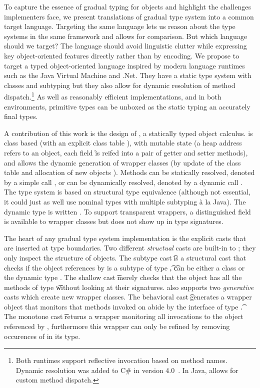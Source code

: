 \documentclass[a4paper,USenglish]{tex/lipics-v2016}
\begin{document}
To capture the essence of gradual typing for objects and highlight the
challenges implementers face, we present translations of gradual type system
into a common target language. Targeting the same language lets us reason
about the type systems in the same framework and allows for comparison. But
which language should we target? The language should avoid linguistic
clutter while expressing key object-oriented features directly rather than
by encoding. We propose to target a typed object-oriented language inspired
by modern language runtimes such as the Java Virtual Machine and .Net.  They
have a static type system with classes and subtyping but they also allow for
dynamic resolution of method dispatch.\footnote{Both runtimes support
  reflective invocation based on method names. Dynamic resolution was added
  to C\# in version 4.0~\cite{BAT14}. In Java,  allows for
  custom method dispatch.} As well as reasonably efficient implementations,
and in both environments, primitive types can be unboxed as the static
typing an accurately final types.

A contribution of this work is the design of \kafka, a statically typed
object calculus.  \kafka is class based (with an explicit class table \K),
with mutable state (a heap address \a refers to an object, each field \f is
reifed into a pair of getter and setter methods), and allows the dynamic
generation of wrapper classes (by update of the class table \K and
allocation of new objects \a).  Methods can be statically resolved, denoted
by a simple call \Call\a\m\x, or can be dynamically resolved, denoted by a
dynamic call \DynCall\a\m\x. The \kafka type system is based on structural
type equivalence (although not essential, it could just as well use nominal
types with multiple subtyping \`a la Java).  The dynamic type is written
\any. To support transparent wrappers, a distinguished \that field is
available to wrapper classes but does not show up in type
signatures.

The heart of any gradual type system implementation is the explicit casts
that are inserted at type boundaries.  Two different \emph{structual} casts
are built-in to \kafka; they only inspect the structure of objects.  The
subtype cast \SubCast\t\a is a structural cast that checks if the object
references by \a is a subtype of type \t, \t can be either a class \C or the
dynamic type \any.  The shallow cast \ShaCast\t\a merely checks that the
object has all the methods of type \t without looking at their signatures.
\kafka also supports two \emph{generative} casts which create new wrapper
classes.  The behavioral cast \BehCast\t\a generates a wrapper object that
monitors that methods invoked on \a abide by the interface of type \t. The
monotone cast \MonCast\t\a returns a wrapper monitoring all invocations to
the object referenced by \a, furthermore this wrapper can only be refined by
removing occurences of \any in its type.
\end{document}

